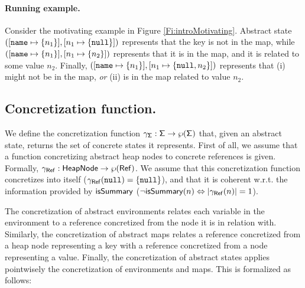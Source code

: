 \paragraph{Running example.} 
Consider the motivating example in Figure \ref{Fi:introMotivating}. Abstract state $([\mathtt{name} \mapsto \{n_1\}], [n_1 \mapsto \{\mathtt{null}\}])$ represents that the key  is not in the map, while $([\mathtt{name} \mapsto \{n_1\}], [n_1 \mapsto \{n_2\}])$ represents that it is in the map, and it is related to some value $n_2$. Finally, $([\mathtt{name} \mapsto \{n_1\}], [n_1 \mapsto \{\mathtt{null}, n_2\}])$ represents that  (i) might not be in the map, \emph{or} (ii) is in the map related to value $n_2$.

\subsection{Concretization function.}
We define the concretization function $\gamma_{\mathsf{\Sigma}} : \mathsf{\Sigma} \to \wp(\mathsf{\Sigma})$ that, given an abstract state, returns the set of concrete states it represents. First of all, we assume that a function concretizing abstract heap nodes to concrete references is given. Formally, $\gamma_{\mathsf{Ref}} : \mathsf{HeapNode} \to \wp(\mathsf{Ref})$. We assume that this concretization function concretizes  into itself ($\gamma_{\mathsf{Ref}}(\mathtt{null})=\{\mathtt{null}\}$), and that it is coherent w.r.t. the information provided by $\mathsf{isSummary}$ ($\neg \mathsf{isSummary}(n) \Leftrightarrow |\gamma_{\mathsf{Ref}}(n)|=1$).

The concretization of abstract environments relates each variable in the environment to a reference concretized from the node it is in relation with. Similarly, the concretization of abstract maps relates a reference concretized from a heap node representing a key with a reference concretized from a node representing a value. Finally, the concretization of abstract states applies pointwisely the concretization of environments and maps. This is formalized as follows:

